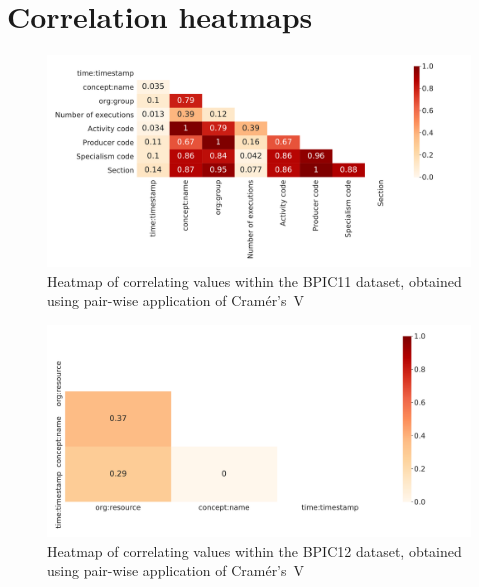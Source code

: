 \chapter{Correlation heatmaps}
\label{appendix:correlation-heatmaps}
\begin{figure}[ht!]
\centering
\includegraphics[width=\textwidth]{gfx/bpic2011/correlation-heatmap.pdf}
\caption[Cramér's V heatmap BPIC11]{Heatmap of correlating values within the BPIC11 dataset, obtained using pair-wise application of Cramér's~V}
\label{fig:BPIC11-correlation-heatmap}
\end{figure}

\begin{figure}[ht!]
\centering
\includegraphics[width=\textwidth]{gfx/bpic2012/correlation-heatmap.pdf}
\caption[Cramér's V heatmap BPIC12]{Heatmap of correlating values within the BPIC12 dataset, obtained using pair-wise application of Cramér's~V}
\label{fig:BPIC12-correlation-heatmap}
\end{figure}

